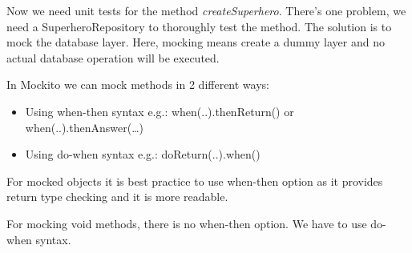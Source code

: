 Now we need unit tests for the method \textit{createSuperhero}. There's one problem, we need a SuperheroRepository to thoroughly test the method.  The solution is to mock the database layer. Here,  mocking means create a dummy layer and no actual database operation will be executed. 

In Mockito we can mock methods in 2 different ways:

\begin{itemize}
\item Using when-then syntax e.g.: when(..).thenReturn() or when(..).thenAnswer(…)
\item Using do-when syntax e.g.: doReturn(..).when()
\end{itemize}

For mocked objects it is best practice to use when-then option as it provides return type checking and it is more readable.

For mocking void methods, there is no when-then option. We have to use do-when syntax.

